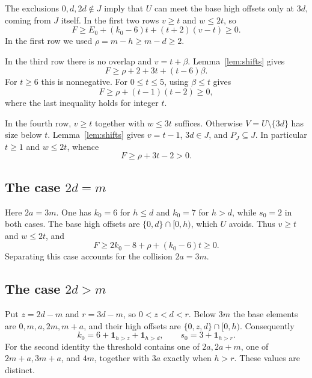 \documentclass[11pt]{article}
\newcommand{\ind}[1]{\mathbf{1}_{#1}}
\begin{document}
The exclusions $0,d,2d\notin J$ imply that $U$ can meet the base high
offsets only at $3d$, coming from $J$ itself.
In the first two rows $v\geq t$ and $w\leq2t$, so
\[
 F\geq E_0+(k_0-6)t+(t+2)(v-t)\geq0.
\]
In the first row we used $\rho=m-h\geq m-d\geq2$.

In the third row there is no overlap and $v=t+\beta$.
Lemma~\ref{lem:shifts} gives
\[
 F\geq \rho+2+3t+(t-6)\beta.
\]
For $t\geq6$ this is nonnegative. For $0\leq t\leq5$, using
$\beta\leq t$ gives
\[
 F\geq \rho+(t-1)(t-2)\geq0,
\]
where the last inequality holds for integer $t$.

In the fourth row, $v\geq t$ together with $w\leq3t$ suffices.
Otherwise $V=U\setminus\{3d\}$ has size below $t$.
Lemma~\ref{lem:shifts} gives $v=t-1$, $3d\in J$, and $P_J\subseteq J$.
In particular $t\geq1$ and $w\leq2t$, whence
\[
 F\geq \rho+3t-2>0.
\]

\subsection{The case \(2d=m\)}

Here $2a=3m$. One has $k_0=6$ for $h\leq d$ and $k_0=7$ for $h>d$,
while $s_0=2$ in both cases.
The base high offsets are $\{0,d\}\cap[0,h)$, which $U$ avoids.
Thus $v\geq t$ and $w\leq2t$, and
\[
 F\geq 2k_0-8+\rho+(k_0-6)t\geq0.
\]
Separating this case accounts for the collision $2a=3m$.

\subsection{The case \(2d>m\)}

Put $z=2d-m$ and $r=3d-m$, so $0<z<d<r$. Below $3m$ the base
elements are $0,m,a,2m,m+a$, and their high offsets are
$\{0,z,d\}\cap[0,h)$. Consequently
\[
 k_0=6+\ind{h>z}+\ind{h>d},\qquad
 s_0=3+\ind{h>r}.
\]
For the second identity the threshold contains one of $2a,2a+m$,
one of $2m+a,3m+a$, and $4m$, together with $3a$ exactly when $h>r$.
These values are distinct.
\end{document}
